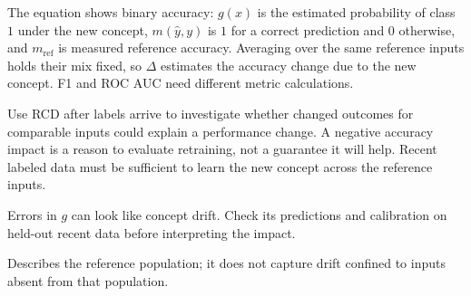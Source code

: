 \begin{metricformula}
\end{metricformula}

The equation shows binary accuracy: $g(x)$ is the estimated probability of class $1$ under the new concept, $m(\hat{y},y)$ is
$1$ for a correct prediction and $0$ otherwise, and $m_{\text{ref}}$ is measured reference accuracy. Averaging over the same
reference inputs holds their mix fixed, so $\Delta$ estimates the accuracy change due to the new concept. F1 and ROC AUC need
different metric calculations.


Use RCD after labels arrive to investigate whether changed outcomes for comparable inputs could explain a performance change.
A negative accuracy impact is a reason to evaluate retraining, not a guarantee it will help. Recent labeled data must be sufficient
to learn the new concept across the reference inputs.


{
\item Errors in $g$ can look like concept drift. Check its predictions and calibration on held-out recent data before interpreting the impact.
\item Describes the reference population; it does not capture drift confined to inputs absent from that population.
}

